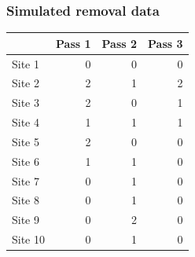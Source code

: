 \documentclass[color=usenames,dvipsnames]{beamer}\usepackage[]{graphicx}\usepackage[]{color}
\newenvironment{knitrout}{}{} %
\begin{document}
\begin{frame}[fragile]
  \frametitle{Simulated removal data}
\begin{knitrout}\small
{}\color{fgcolor}\begin{table}

\begin{tabular}{lrrr}
\toprule
  & Pass 1 & Pass 2 & Pass 3\\
\midrule
Site 1 & 0 & 0 & 0\\
Site 2 & 2 & 1 & 2\\
Site 3 & 2 & 0 & 1\\
Site 4 & 1 & 1 & 1\\
Site 5 & 2 & 0 & 0\\
\addlinespace
Site 6 & 1 & 1 & 0\\
Site 7 & 0 & 1 & 0\\
Site 8 & 0 & 1 & 0\\
Site 9 & 0 & 2 & 0\\
Site 10 & 0 & 1 & 0\\
\bottomrule
\end{tabular}
\end{table}

\end{knitrout}
\end{frame}
\end{document}
